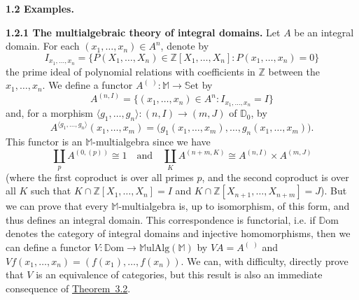 \documentclass{article}
\newenvironment{rmenv}[1]
  {\phantomsection\par\medskip\noindent\textbf{#1.}\rmfamily}
  {\medskip}
\newcommand{\bb}[1]{{\mathbb{#1}}}
\newcommand{\Set}{\mathbb{S}\mathrm{et}}
\newcommand{\MulAlg}{\mathbb{M}\mathrm{ulAlg}}
\newcommand{\Dom}{\mathbb{D}\mathrm{om}}
\newcommand{\oldpage}[1]{\marginpar{\footnotesize$\Big\vert$ \textit{p.~#1}}}
\begin{document}
\begin{rmenv}{1.2 Examples}
\begin{rmenv}{1.2.1 The multialgebraic theory of integral domains}
\oldpage{195}
    Let $A$ be an integral domain.
    For each $(x_1,\ldots,x_n)\in A^n$, denote by
    \[
      I_{x_1,\ldots,x_n} =
      \big\{
        P(X_1,\ldots,X_n)\in\bb{Z}[X_1,\ldots,X_n]
        :
        P(x_1,\ldots,x_n)=0
      \big\}
    \]
    the prime ideal of polynomial relations with coefficients in $\bb{Z}$ between the $x_1,\ldots,x_n$.
    We define a functor $A^{(\,\,)}\colon\bb{M}\to\Set$ by
    \[
      A^{(n,I)}=\{(x_1,\ldots,x_n)\in A^n:I_{x_1,\ldots,x_n}=I\}
    \]
    and, for a morphism $\langle g_1,\ldots,g_n\rangle\colon(n,I)\to(m,J)$ of $\bb{D}_0$, by
    \[
      A^{\langle g_1,\ldots,g_n\rangle}(x_1,\ldots,x_m) =
      \big(
        g_1(x_1,\ldots,x_m),
        \ldots,
        g_n(x_1,\ldots,x_m)
      \big).
    \]
    This functor is an $\bb{M}$-multialgebra since we have
    \[
      \coprod_p A^{(0,(p))} \cong 1
      \quad\text{and}\quad
      \coprod_K A^{(n+m,K)} \cong A^{(n,I)}\times A^{(m,J)}
    \]
    (where the first coproduct is over all primes $p$, and the second coproduct is over all $K$ such that $K\cap\bb{Z}[X_1,\ldots,X_n] = I$ and $K\cap\bb{Z}[X_{n+1},\ldots,X_{n+m}] = J$).
    But we can prove that every $\bb{M}$-multialgebra is, up to isomorphism, of this form, and thus defines an integral domain.
    This correspondence is functorial, i.e. if $\Dom$ denotes the category of integral domains and injective homomorphisms, then we can define a functor $V\colon\Dom\to\MulAlg(\bb{M})$ by $VA=A^{(\,\,)}$ and $Vf(x_1,\ldots,x_n)=(f(x_1),\ldots,f(x_n))$.
    We can, with difficulty, directly prove that $V$ is an equivalence of categories, but this result is also an immediate consequence of \hyperref[theorem-3.2]{Theorem~3.2}.
  \end{rmenv}


\end{rmenv}
\end{document}
